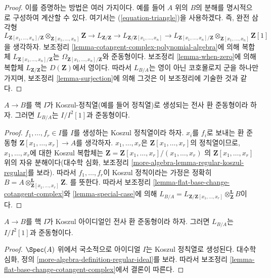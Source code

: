 \begin{proof}
이를 증명하는 방법은 여러 가지이다. 예를 들어 $A$ 위의 $B$의 분해를
명시적으로 구성하여 계산할 수 있다. 여기서는 (\ref{equation-triangle})을
사용하겠다. 즉, 완전 삼각형
$$
L_{\mathbf{Z}[x_1, \ldots, x_n]/\mathbf{Z}}
\otimes_{\mathbf{Z}[x_1, \ldots, x_n]} \mathbf{Z} \to
L_{\mathbf{Z}/\mathbf{Z}} \to
L_{\mathbf{Z}/\mathbf{Z}[x_1, \ldots, x_n]}\to
L_{\mathbf{Z}[x_1, \ldots, x_n]/\mathbf{Z}}
\otimes_{\mathbf{Z}[x_1, \ldots, x_n]} \mathbf{Z}[1]
$$
을 생각하자. 보조정리 \ref{lemma-cotangent-complex-polynomial-algebra}에 의해
복합체 $L_{\mathbf{Z}[x_1, \ldots, x_n]/\mathbf{Z}}$는
$\Omega_{\mathbf{Z}[x_1, \ldots, x_n]/\mathbf{Z}}$와 준동형이다. 보조정리
\ref{lemma-when-zero}에 의해 복합체 $L_{\mathbf{Z}/\mathbf{Z}}$는
$D(\mathbf{Z})$에서 영이다. 따라서 $L_{B/A}$는 영이 아닌 코호몰로지
군을 하나만 가지며, 보조정리 \ref{lemma-surjection}에 의해 그것은 이
보조정리에 기술한 것과 같다.
\end{proof}

\begin{lemma}
\label{lemma-mod-regular-sequence}
$A \to B$를 핵 $I$가 Koszul-정칙열(예를 들어 정칙열)로 생성되는 전사
환 준동형이라 하자. 그러면 $L_{B/A}$는 $I/I^2[1]$과 준동형이다.
\end{lemma}

\begin{proof}
$f_1, \ldots, f_r \in I$를 $I$를 생성하는 Koszul 정칙열이라 하자.
$x_i$를 $f_i$로 보내는 환 준동형
$\mathbf{Z}[x_1, \ldots, x_r] \to A$를 생각하자.
$x_1, \ldots, x_r$은 $\mathbf{Z}[x_1, \ldots, x_r]$의 정칙열이므로,
$x_1, \ldots, x_r$에 대한 Koszul 복합체는
$\mathbf{Z} = \mathbf{Z}[x_1, \ldots, x_r]/(x_1, \ldots, x_r)$
의 $\mathbf{Z}[x_1, \ldots, x_r]$ 위의 자유 분해이다(대수학 심화,
보조정리 \ref{more-algebra-lemma-regular-koszul-regular}를 보라). 따라서
$f_1, \ldots, f_r$이 Koszul 정칙이라는 가정은 정확히
$B = A \otimes_{\mathbf{Z}[x_1, \ldots, x_r]}^\mathbf{L} \mathbf{Z}$.
를 뜻한다. 따라서 보조정리
\ref{lemma-flat-base-change-cotangent-complex}와
\ref{lemma-special-case}에 의해
$L_{B/A} = L_{\mathbf{Z}/\mathbf{Z}[x_1, \ldots, x_r]}
\otimes_\mathbf{Z}^\mathbf{L} B$이다.
\end{proof}

\begin{lemma}
\label{lemma-mod-Koszul-regular-ideal}
$A \to B$를 핵 $I$가 Koszul 아이디얼인 전사 환 준동형이라 하자. 그러면
$L_{B/A}$는 $I/I^2[1]$과 준동형이다.
\end{lemma}

\begin{proof}
$\Spec(A)$ 위에서 국소적으로 아이디얼 $I$는 Koszul 정칙열로 생성된다.
대수학 심화, 정의 \ref{more-algebra-definition-regular-ideal}를 보라. 따라서
보조정리 \ref{lemma-flat-base-change-cotangent-complex}에서 결론이 따른다.
\end{proof}

